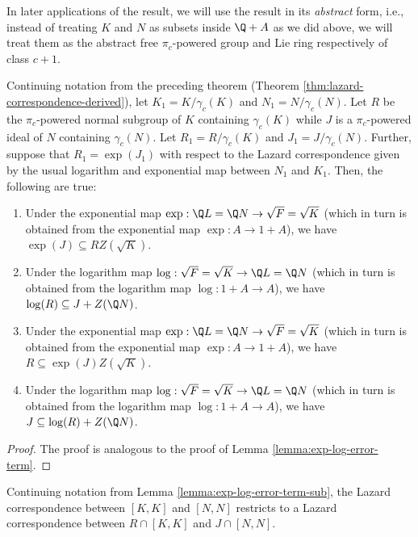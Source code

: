 \documentclass{ucetd}
\begin{document}
In later applications of the result, we will use the result in its
{\em abstract} form, i.e., instead of treating $K$ and $N$ as subsets
inside $\Q + A$ as we did above, we will treat them as the abstract
free $\pi_c$-powered group and Lie ring respectively of class $c + 1$.

\begin{lemma}\label{lemma:exp-log-error-term-sub}
  Continuing notation from the preceding theorem (Theorem
  \ref{thm:lazard-correspondence-derived}), let $K_1 =
  K/\gamma_c(K)$ and $N_1 = N/\gamma_c(N)$. Let $R$ be the
  $\pi_c$-powered normal subgroup of $K$ containing $\gamma_c(K)$
  while $J$ is a $\pi_c$-powered ideal of $N$ containing
  $\gamma_c(N)$. Let $R_1 = R/\gamma_c(K)$ and $J_1 =
  J/\gamma_c(N)$. Further, suppose that $R_1 = \exp(J_1)$ with respect
  to the Lazard correspondence given by the usual logarithm and
  exponential map between $N_1$ and $K_1$. Then, the following are true:

  \begin{enumerate}
  \item Under the exponential map $\exp: \Q L = \Q N \to \sqrt{F} =
    \sqrt{K}$ (which in turn is obtained from the exponential map
    $\exp:A \to 1 + A$), we have $\exp(J) \subseteq
    RZ(\sqrt{K})$. 
  \item Under the logarithm map $\log: \sqrt{F} = \sqrt{K} \to \Q L =
    \Q N$ (which in turn is obtained from the logarithm map $\log:1 +
    A \to A$), we have $\log(R) \subseteq J + Z(\Q N)$.
  \item Under the exponential map $\exp: \Q L = \Q N \to \sqrt{F} =
    \sqrt{K}$ (which in turn is obtained from the exponential map
    $\exp:A \to 1 + A$), we have $R \subseteq
    \exp(J)Z(\sqrt{K})$. 
  \item Under the logarithm map $\log: \sqrt{F} = \sqrt{K} \to \Q L =
    \Q N$ (which in turn is obtained from the logarithm map $\log:1 +
    A \to A$), we have $J \subseteq \log(R) + Z(\Q N)$.

  \end{enumerate}
\end{lemma}

\begin{proof}
  The proof is analogous to the proof of Lemma
  \ref{lemma:exp-log-error-term}.
\end{proof}

\begin{theorem}\label{thm:lazard-correspondence-intersect-kernel}
  Continuing notation from Lemma \ref{lemma:exp-log-error-term-sub},
  the Lazard correspondence between $[K,K]$ and $[N,N]$ restricts to
  a Lazard correspondence between $R \cap [K,K]$ and $J \cap [N,N]$.
\end{theorem}
\end{document}
